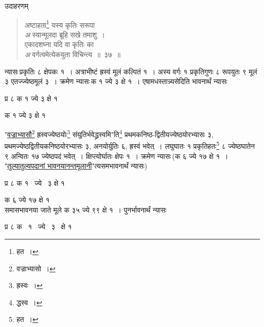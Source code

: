 \documentclass[11pt, openany]{book}
\begin{document}
उदाहरणम् \textendash 

\begin{quote}
{\color{red}अष्टाहता\renewcommand{\thefootnote}{११}\footnote{हत~।} यस्य कृतिः सरूपा \\
\emph{\color{white}अ} \hspace{2mm} स्यान्मूलदा ब्रूहि सखे तमाशु~। \\
एकादशघ्ना यदि वा कृतिः का \\
\emph{\color{white}अ} \hspace{2mm} वर्गत्वमेत्येकयुता विचिन्त्य~॥~३७~॥}
\end{quote}

न्यासः\textendash \,प्रकृतिः ८ क्षेपकः १~। अत्राभीष्टं ह्रस्वं मूलं कल्पितं १~।
अस्य वर्गः १ प्रकृतिगुणः ८ रूपयुतः ९ मूलं ३ एतज्ज्येष्ठमूलं ३~। क्रमेण न्यासः\textendash \,क १ ज्ये ३ क्षे १~। एषामधस्तान्न्यसेदिति भावनार्थं न्यासः \textendash 
\vspace{1mm}

\hspace{16mm} प्र ८ क १ ज्ये ३ क्षे १ 
\vspace{1mm}

\hspace{22mm} क १ ज्ये ३ क्षे १ 

\newpage

\noindent "\hyperref[72]{वज्राभ्यासौ\renewcommand{\thefootnote}{१}\footnote{वज्राभ्यासो~।} ह्रस्वज्येष्ठयोः\renewcommand{\thefootnote}{२}\footnote{ह्रस्वः~।} संयुतिर्भवेद्ध्रस्वमि}"ति\renewcommand{\thefootnote}{३}\footnote{द्धस्व~।} प्रथमकनिष्ठ-द्वितीयज्येष्ठयोरभ्यासः ३, प्रथमज्येष्ठद्वितीयकनिष्ठयोरभ्यासः ३, अनयोर्युतिः ६, ह्रस्वं भवेत्~। लघुघातः १ प्रकृतिहतः\renewcommand{\thefootnote}{४}\footnote{हत~।} ८ ज्येष्ठघातेन ९ अन्वितः १७ ज्येष्ठपदं भवेत्~। क्षिप्त्योर्घातः क्षेपः १~। क्रमेण न्यासः\textendash \,(क ६ ज्ये १७ क्षे १~। "\hyperref[76]{तुल्यातुल्यपदानां भावनयानन्तमूलानी}"त्यसमभावनार्थं न्यासः) \textendash 
\vspace{2mm}

\hspace{16mm} प्र ८ क १ ~ज्ये ~३ क्षे १ 
\vspace{1mm}

\hspace{22mm} क ६ ज्ये १७ क्षे १ \\

\noindent समासभावनया जाते मूले क ३५ ज्ये ९९ क्षे १~। पुनर्भावनार्थं न्यासः \textendash 
\vspace{2mm}

\hspace{16mm} प्र ८ क ~१ ~ज्ये ~३ ~क्षे १ 
\vspace{1mm}
\end{document}
